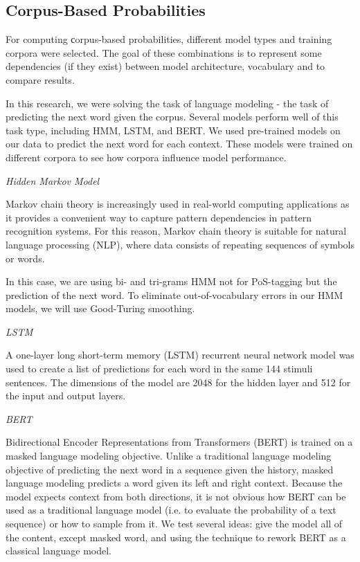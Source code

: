 \documentclass[a4paper]{article}
\newcommand{\head}[1]{\vspace{0.5em}\emph{#1}\vspace{0.25em}}
\begin{document}
\subsection{Corpus-Based Probabilities}

For computing сorpus-based probabilities, different model types and training corpora were selected. The goal of these combinations is to represent some dependencies (if they exist) between model architecture,  vocabulary and to compare results.

In this research, we were solving the task of language modeling - the task of predicting the next word given the corpus. 
Several models perform well of this task type, including HMM, LSTM, and BERT. We used pre-trained models on our data to predict the next word for each context. These models were trained on different corpora to see how corpora influence model performance.

\head{Hidden Markov Model}

Markov chain theory is increasingly used in real-world computing applications as it provides a convenient way to capture pattern dependencies in pattern recognition systems. For this reason, Markov chain theory is suitable for natural language processing (NLP), where data consists of repeating sequences of symbols or words. 

In this case, we are using bi- and tri-grams HMM not for PoS-tagging but the prediction of the next word. To eliminate out-of-vocabulary errors in our HMM models, we will use Good-Turing smoothing.

\head{LSTM}

A one-layer long short-term memory (LSTM) recurrent neural network model was used \cite{jozefowicz:2016} to create a list of predictions for each word in the same 144 stimuli sentences. The dimensions of the model are 2048 for the hidden layer and 512 for the input and output layers. 

\head{BERT}

Bidirectional Encoder Representations from Transformers
(BERT) \cite{bert} is trained on a masked language modeling objective. Unlike a traditional language modeling objective of predicting the next word in a sequence given the history, masked language modeling predicts a word given its left and right context. Because the model expects context from both directions, it is not obvious how BERT can be used as a traditional language model (i.e. to evaluate the probability of a text sequence) or how to sample from it. We test several ideas: give the model all of the content, except masked word, and using the technique\cite{wang2019bert_lm} to rework BERT as a classical language model.
\end{document}
